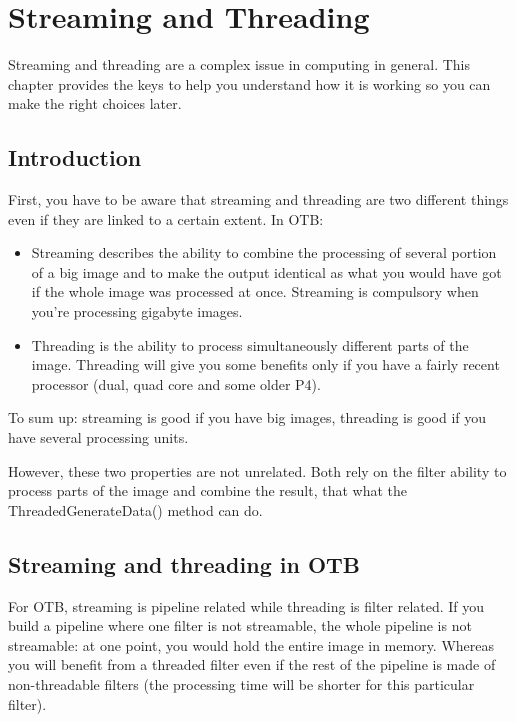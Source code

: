 \chapter{Streaming and Threading}
\label{sec:StreamingAndThreading}


Streaming and threading are a complex issue in computing in general. This
chapter provides the keys to help you understand how it is working so you can
make the right choices later.

\section{Introduction}

First, you have to be aware that streaming and threading are two different
things even if they are linked to a certain extent. In OTB:

\begin{itemize}
\item Streaming describes the ability to combine the processing of several
portion of a big image and to make the output identical as what you would have
got if the whole image was processed at once. Streaming is compulsory when
you're processing gigabyte images. 
\item Threading is the ability to process simultaneously different parts of the
image. Threading will give you some benefits only if you have a fairly recent
processor (dual, quad core and some older P4).
\end{itemize}



To sum up: streaming is good if you have big images, threading is good if you
have several processing units.

However, these two properties are not unrelated. Both rely on the filter ability
to process parts of the image and combine the result, that what the
ThreadedGenerateData() method can do.

\section{Streaming and threading in OTB}

For OTB, streaming is pipeline related while threading is filter related. If you
build a pipeline where one filter is not streamable, the whole pipeline is not
streamable: at one point, you would hold the entire image in memory. Whereas you
will benefit from a threaded filter even if the rest of the pipeline is made of
non-threadable filters (the processing time will be shorter for this particular
filter).


